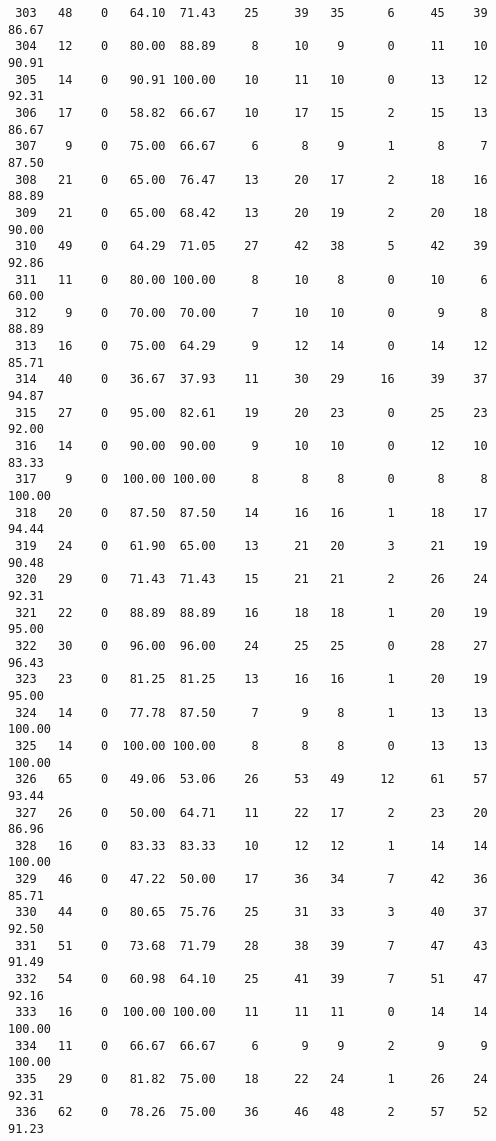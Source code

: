 \begin{verbatim}
 303   48    0   64.10  71.43    25     39   35      6     45    39    86.67
 304   12    0   80.00  88.89     8     10    9      0     11    10    90.91
 305   14    0   90.91 100.00    10     11   10      0     13    12    92.31
 306   17    0   58.82  66.67    10     17   15      2     15    13    86.67
 307    9    0   75.00  66.67     6      8    9      1      8     7    87.50
 308   21    0   65.00  76.47    13     20   17      2     18    16    88.89
 309   21    0   65.00  68.42    13     20   19      2     20    18    90.00
 310   49    0   64.29  71.05    27     42   38      5     42    39    92.86
 311   11    0   80.00 100.00     8     10    8      0     10     6    60.00
 312    9    0   70.00  70.00     7     10   10      0      9     8    88.89
 313   16    0   75.00  64.29     9     12   14      0     14    12    85.71
 314   40    0   36.67  37.93    11     30   29     16     39    37    94.87
 315   27    0   95.00  82.61    19     20   23      0     25    23    92.00
 316   14    0   90.00  90.00     9     10   10      0     12    10    83.33
 317    9    0  100.00 100.00     8      8    8      0      8     8   100.00
 318   20    0   87.50  87.50    14     16   16      1     18    17    94.44
 319   24    0   61.90  65.00    13     21   20      3     21    19    90.48
 320   29    0   71.43  71.43    15     21   21      2     26    24    92.31
 321   22    0   88.89  88.89    16     18   18      1     20    19    95.00
 322   30    0   96.00  96.00    24     25   25      0     28    27    96.43
 323   23    0   81.25  81.25    13     16   16      1     20    19    95.00
 324   14    0   77.78  87.50     7      9    8      1     13    13   100.00
 325   14    0  100.00 100.00     8      8    8      0     13    13   100.00
 326   65    0   49.06  53.06    26     53   49     12     61    57    93.44
 327   26    0   50.00  64.71    11     22   17      2     23    20    86.96
 328   16    0   83.33  83.33    10     12   12      1     14    14   100.00
 329   46    0   47.22  50.00    17     36   34      7     42    36    85.71
 330   44    0   80.65  75.76    25     31   33      3     40    37    92.50
 331   51    0   73.68  71.79    28     38   39      7     47    43    91.49
 332   54    0   60.98  64.10    25     41   39      7     51    47    92.16
 333   16    0  100.00 100.00    11     11   11      0     14    14   100.00
 334   11    0   66.67  66.67     6      9    9      2      9     9   100.00
 335   29    0   81.82  75.00    18     22   24      1     26    24    92.31
 336   62    0   78.26  75.00    36     46   48      2     57    52    91.23

\end{verbatim}
